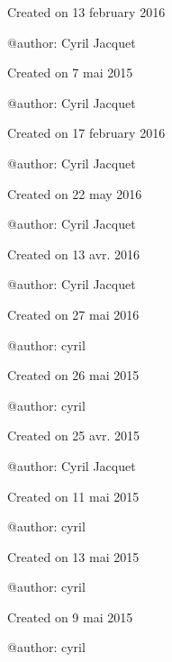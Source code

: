 \begin{DoxyVerb}Created on 13 february 2016

@author:  Cyril Jacquet
\end{DoxyVerb}


\begin{DoxyVerb}Created on 7 mai 2015

@author:  Cyril Jacquet
\end{DoxyVerb}


\begin{DoxyVerb}Created on 17 february 2016

@author:  Cyril Jacquet
\end{DoxyVerb}


\begin{DoxyVerb}Created on 22 may 2016

@author:  Cyril Jacquet
\end{DoxyVerb}


\begin{DoxyVerb}Created on 13 avr. 2016

@author:  Cyril Jacquet
\end{DoxyVerb}


\begin{DoxyVerb}Created on 27 mai 2016

@author: cyril
\end{DoxyVerb}


\begin{DoxyVerb}Created on 26 mai 2015

@author: cyril
\end{DoxyVerb}


\begin{DoxyVerb}Created on 25 avr. 2015

@author: Cyril Jacquet
\end{DoxyVerb}


\begin{DoxyVerb}Created on 11 mai 2015

@author: cyril
\end{DoxyVerb}


\begin{DoxyVerb}Created on 13 mai 2015

@author: cyril
\end{DoxyVerb}


\begin{DoxyVerb}Created on 9 mai 2015

@author: cyril
\end{DoxyVerb}


